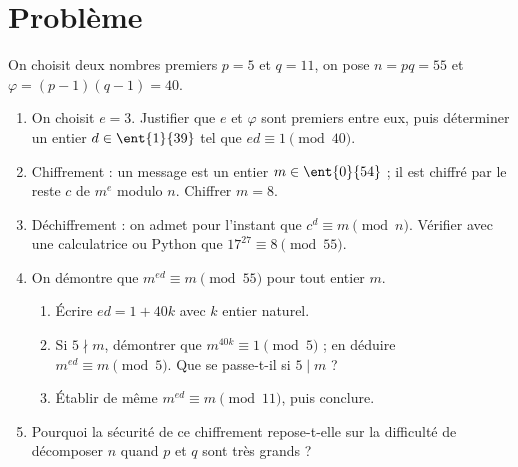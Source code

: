 \mxnewpage
\section{Problème}
\begin{problem}
On choisit deux nombres premiers $p=5$ et $q=11$, on pose $n=pq=55$ et $\varphi=(p-1)(q-1)=40$.
\begin{enumerate}
\item On choisit $e=3$. Justifier que $e$ et $\varphi$ sont premiers entre eux, puis déterminer un entier $d\in\ent{1}{39}$ tel que $ed\equiv1\pmod{40}$.
\item Chiffrement : un message est un entier $m\in\ent{0}{54}$ ; il est chiffré par le reste $c$ de $m^e$ modulo $n$. Chiffrer $m=8$.
\item Déchiffrement : on admet pour l'instant que $c^d\equiv m\pmod n$. Vérifier avec une calculatrice ou Python que $17^{27}\equiv8\pmod{55}$.
\item On démontre que $m^{ed}\equiv m\pmod{55}$ pour tout entier $m$.
\begin{enumerate}
\item Écrire $ed=1+40k$ avec $k$ entier naturel.
\item Si $5\nmid m$, démontrer que $m^{40k}\equiv1\pmod5$ ; en déduire $m^{ed}\equiv m\pmod5$. Que se passe-t-il si $5\mid m$ ?
\item Établir de même $m^{ed}\equiv m\pmod{11}$, puis conclure.
\end{enumerate}
\item Pourquoi la sécurité de ce chiffrement repose-t-elle sur la difficulté de décomposer $n$ quand $p$ et $q$ sont très grands ?
\end{enumerate}
\end{problem}
